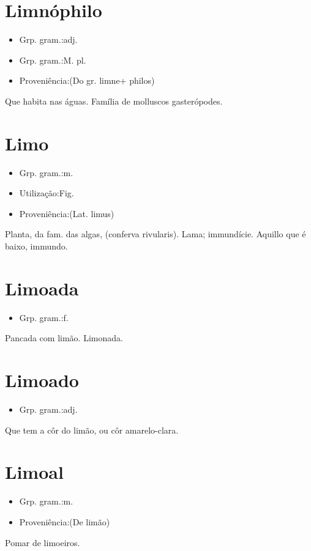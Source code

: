 \section{Limnóphilo}
\begin{itemize}
\item {Grp. gram.:adj.}
\end{itemize}
\begin{itemize}
\item {Grp. gram.:M. pl.}
\end{itemize}
\begin{itemize}
\item {Proveniência:(Do gr. \textunderscore limne\textunderscore  + \textunderscore philos\textunderscore )}
\end{itemize}
Que habita nas águas.
Família de molluscos gasterópodes.
\section{Limo}
\begin{itemize}
\item {Grp. gram.:m.}
\end{itemize}
\begin{itemize}
\item {Utilização:Fig.}
\end{itemize}
\begin{itemize}
\item {Proveniência:(Lat. \textunderscore limus\textunderscore )}
\end{itemize}
Planta, da fam. das algas, (\textunderscore conferva rivularis\textunderscore ).
Lama; immundície.
Aquillo que é baixo, immundo.
\section{Limoada}
\begin{itemize}
\item {Grp. gram.:f.}
\end{itemize}
Pancada com limão.
Limonada.
\section{Limoado}
\begin{itemize}
\item {Grp. gram.:adj.}
\end{itemize}
Que tem a côr do limão, ou côr amarelo-clara.
\section{Limoal}
\begin{itemize}
\item {Grp. gram.:m.}
\end{itemize}
\begin{itemize}
\item {Proveniência:(De \textunderscore limão\textunderscore )}
\end{itemize}
Pomar de limoeiros.
